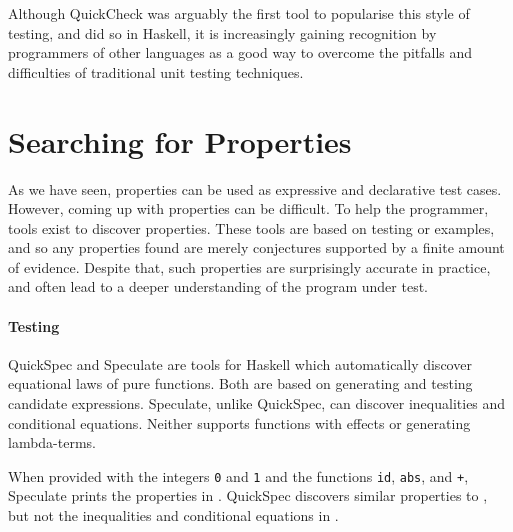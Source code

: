 Although QuickCheck was arguably the first tool to popularise this style of
testing, and did so in Haskell, it is increasingly gaining recognition by
programmers of other languages as a good way to overcome the pitfalls and
difficulties of traditional unit testing techniques.

\section{Searching for Properties}
\label{sec:property_testing-gen}

As we have seen, properties can be used as expressive and declarative
test cases.  However, coming up with properties can be difficult.  To
help the programmer, tools exist to discover properties.  These tools
are based on testing or examples, and so any properties found are
merely conjectures supported by a finite amount of evidence.  Despite
that, such properties are surprisingly accurate in practice, and often
lead to a deeper understanding of the program under test.

\paragraph{Testing}
QuickSpec\cite{claessen2010,smallbone2017} and
Speculate\cite{braquehais2017} are tools for Haskell which
automatically discover equational laws of pure functions.  Both are
based on generating and testing candidate expressions.  Speculate,
unlike QuickSpec, can discover inequalities and conditional equations.
Neither supports functions with effects or generating lambda-terms.

When provided with the integers \verb|0| and \verb|1| and the
functions \verb|id|, \verb|abs|, and \verb|+|, Speculate prints the
properties in .  QuickSpec discovers similar
properties to , but not the inequalities and
conditional equations in .

